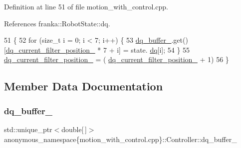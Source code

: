 Definition at line 51 of file motion\+\_\+with\+\_\+control.\+cpp.



References franka\+::\+Robot\+State\+::dq.


\begin{DoxyCode}
51                                                      \{
52     \textcolor{keywordflow}{for} (\textcolor{keywordtype}{size\_t} i = 0; i < 7; i++) \{
53       \hyperlink{classanonymous__namespace_02motion__with__control_8cpp_03_1_1Controller_a9c8092a809e69272e26dc32e7717b128}{dq\_buffer\_}.get()[\hyperlink{classanonymous__namespace_02motion__with__control_8cpp_03_1_1Controller_a81ac6a197c91f10e2705c015c0ac3144}{dq\_current\_filter\_position\_} * 7 + i] = state.
      \hyperlink{structfranka_1_1RobotState_af372a0081d72bc7b4fe873f99c7b2d8c}{dq}[i];
54     \}
55     \hyperlink{classanonymous__namespace_02motion__with__control_8cpp_03_1_1Controller_a81ac6a197c91f10e2705c015c0ac3144}{dq\_current\_filter\_position\_} = (
      \hyperlink{classanonymous__namespace_02motion__with__control_8cpp_03_1_1Controller_a81ac6a197c91f10e2705c015c0ac3144}{dq\_current\_filter\_position\_} + 1) %
56   \}
\end{DoxyCode}


\subsection{Member Data Documentation}
\mbox{\label{classanonymous__namespace_02motion__with__control_8cpp_03_1_1Controller_a9c8092a809e69272e26dc32e7717b128}} 
\subsubsection{\texorpdfstring{dq\+\_\+buffer\+\_\+}{dq\_buffer\_}}
{\footnotesize\ttfamily std\+::unique\+\_\+ptr$<$double\mbox{[}$\,$\mbox{]}$>$ anonymous\+\_\+namespace\{motion\+\_\+with\+\_\+control.\+cpp\}\+::Controller\+::dq\+\_\+buffer\+\_\+\hspace{0.3cm}{\ttfamily [private]}}



